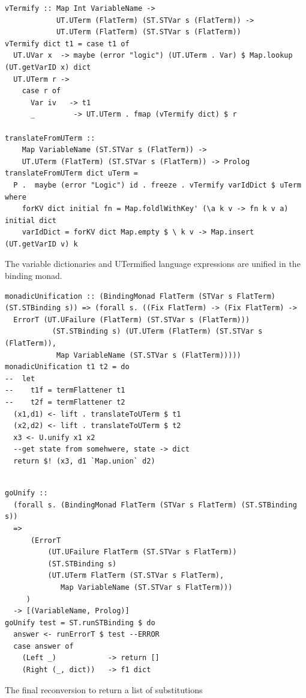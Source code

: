 \documentclass[thesis-solanki.tex]{subfiles}
\begin{document}
\begin{verbatim}
vTermify :: Map Int VariableName ->
            UT.UTerm (FlatTerm) (ST.STVar s (FlatTerm)) ->
            UT.UTerm (FlatTerm) (ST.STVar s (FlatTerm))
vTermify dict t1 = case t1 of
  UT.UVar x  -> maybe (error "logic") (UT.UTerm . Var) $ Map.lookup (UT.getVarID x) dict
  UT.UTerm r ->
    case r of
      Var iv   -> t1
      _         -> UT.UTerm . fmap (vTermify dict) $ r

translateFromUTerm ::
    Map VariableName (ST.STVar s (FlatTerm)) ->
    UT.UTerm (FlatTerm) (ST.STVar s (FlatTerm)) -> Prolog
translateFromUTerm dict uTerm =
  P .  maybe (error "Logic") id . freeze . vTermify varIdDict $ uTerm where
    forKV dict initial fn = Map.foldlWithKey' (\a k v -> fn k v a) initial dict
    varIdDict = forKV dict Map.empty $ \ k v -> Map.insert (UT.getVarID v) k
\end{verbatim}


The variable dictionaries and UTermified language expressions are unified in the binding monad.

\begin{verbatim}
monadicUnification :: (BindingMonad FlatTerm (STVar s FlatTerm) (ST.STBinding s)) => (forall s. ((Fix FlatTerm) -> (Fix FlatTerm) ->
  ErrorT (UT.UFailure (FlatTerm) (ST.STVar s (FlatTerm)))
           (ST.STBinding s) (UT.UTerm (FlatTerm) (ST.STVar s (FlatTerm)),
            Map VariableName (ST.STVar s (FlatTerm)))))
monadicUnification t1 t2 = do
--  let
--    t1f = termFlattener t1
--    t2f = termFlattener t2
  (x1,d1) <- lift . translateToUTerm $ t1
  (x2,d2) <- lift . translateToUTerm $ t2
  x3 <- U.unify x1 x2
  --get state from somehwere, state -> dict
  return $! (x3, d1 `Map.union` d2)
\end{verbatim}


\begin{verbatim}

goUnify ::
  (forall s. (BindingMonad FlatTerm (STVar s FlatTerm) (ST.STBinding s))
  =>
      (ErrorT
          (UT.UFailure FlatTerm (ST.STVar s FlatTerm))
          (ST.STBinding s)
          (UT.UTerm FlatTerm (ST.STVar s FlatTerm),
             Map VariableName (ST.STVar s FlatTerm)))
     )
  -> [(VariableName, Prolog)]
goUnify test = ST.runSTBinding $ do
  answer <- runErrorT $ test --ERROR
  case answer of
    (Left _)            -> return []
    (Right (_, dict))   -> f1 dict
\end{verbatim}


The final reconversion to return a list of substitutions
\end{document}
